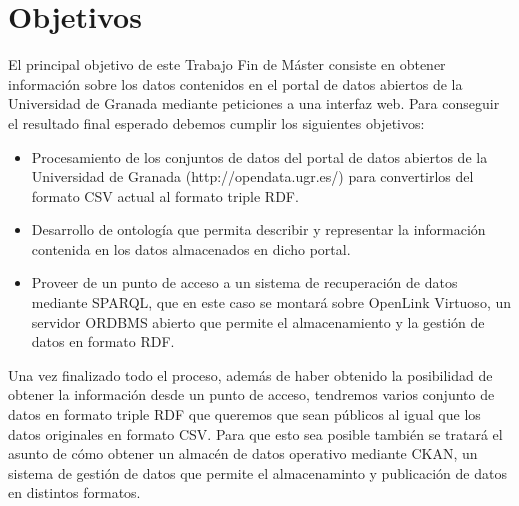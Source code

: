 \chapter{Objetivos}

El principal objetivo de este Trabajo Fin de Máster consiste en obtener información sobre los datos contenidos en el portal de datos abiertos de la Universidad de Granada mediante peticiones a una interfaz web. Para conseguir el resultado final esperado debemos cumplir los siguientes objetivos:

\begin{itemize}
	\item Procesamiento de los conjuntos de datos del portal de datos abiertos de la Universidad de Granada (http://opendata.ugr.es/) para convertirlos del formato CSV actual al formato triple RDF.
	\item Desarrollo de ontología que permita describir y representar la información contenida en los datos almacenados en dicho portal.
	\item Proveer de un punto de acceso a un sistema de recuperación de datos mediante SPARQL, que en este caso se montará sobre OpenLink Virtuoso, un servidor ORDBMS abierto que permite el almacenamiento y la gestión de datos en formato RDF.
\end{itemize}

Una vez finalizado todo el proceso, además de haber obtenido la posibilidad de obtener la información desde un punto de acceso, tendremos varios conjunto de datos en formato triple RDF que queremos que sean públicos al igual que los datos originales en formato CSV. Para que esto sea posible también se tratará el asunto de cómo obtener un almacén de datos operativo mediante CKAN, un sistema de gestión de datos que permite el almacenaminto y publicación de datos en distintos formatos.